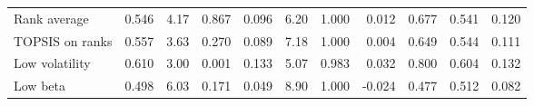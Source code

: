 \begin{table}[!htbp]
\begin{adjustbox}{max width=\textwidth}
\begin{tabular}{lrrrrrrrrrr}
Rank average & 0.546 & 4.17 & 0.867 & 0.096 & 6.20 & 1.000 & 0.012 & 0.677 & 0.541 & 0.120 \\
TOPSIS on ranks & 0.557 & 3.63 & 0.270 & 0.089 & 7.18 & 1.000 & 0.004 & 0.649 & 0.544 & 0.111 \\
Low volatility & 0.610 & 3.00 & 0.001 & 0.133 & 5.07 & 0.983 & 0.032 & 0.800 & 0.604 & 0.132 \\
Low beta & 0.498 & 6.03 & 0.171 & 0.049 & 8.90 & 1.000 & -0.024 & 0.477 & 0.512 & 0.082 \\
\bottomrule
\end{tabular}
\end{adjustbox}
\end{table}
